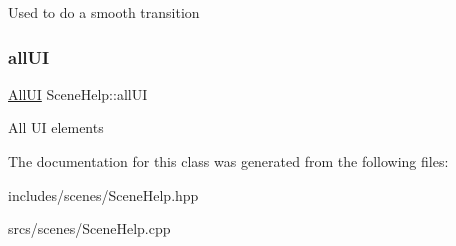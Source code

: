 Used to do a smooth transition \mbox{\label{class_scene_help_a81b24ca15d36e6e5fb6e25d074a81c40}} 
\subsubsection{\texorpdfstring{all\+UI}{allUI}}
{\footnotesize\ttfamily \hyperlink{struct_scene_help_1_1_all_u_i}{All\+UI} Scene\+Help\+::all\+UI\hspace{0.3cm}{\ttfamily [protected]}}

All UI elements 

The documentation for this class was generated from the following files\+:\begin{DoxyCompactItemize}
\item 
includes/scenes/Scene\+Help.\+hpp\item 
srcs/scenes/Scene\+Help.\+cpp\end{DoxyCompactItemize}
